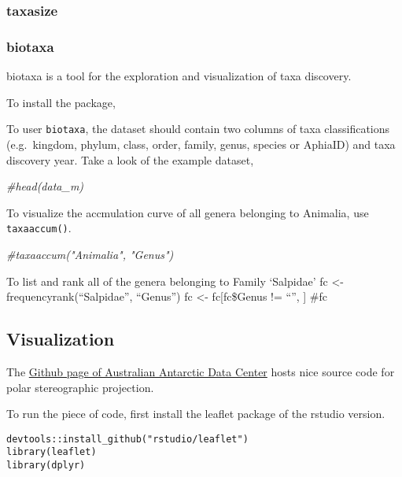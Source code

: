 \documentclass[]{article}
\newenvironment{Shaded}{\begin{snugshade}}{\end{snugshade}}
\newcommand{\CommentTok}[1]{\textcolor[rgb]{0.56,0.35,0.01}{\textit{#1}}}
\begin{document}
\subsubsection{taxasize}\label{taxasize}

\subsubsection{biotaxa}\label{biotaxa}

biotaxa is a tool for the exploration and visualization of taxa
discovery.

To install the package,

To user \texttt{biotaxa}, the dataset should contain two columns of taxa
classifications (e.g.~kingdom, phylum, class, order, family, genus,
species or AphiaID) and taxa discovery year. Take a look of the example
dataset,

\begin{Shaded}
\begin{Highlighting}[]
\CommentTok{#head(data_m)}
\end{Highlighting}
\end{Shaded}

To visualize the accmulation curve of all genera belonging to Animalia,
use \texttt{taxaaccum()}.

\begin{Shaded}
\begin{Highlighting}[]
\CommentTok{#taxaaccum("Animalia", "Genus")}
\end{Highlighting}
\end{Shaded}

To list and rank all of the genera belonging to Family `Salpidae' fc
\textless{}- frequencyrank(``Salpidae'', ``Genus'') fc \textless{}-
fc{[}fc\$Genus != ``'', {]} \#fc

\subsection{Visualization}\label{visualization}

The
\href{https://github.com/AustralianAntarcticDataCentre/antanym-demo}{Github
page of Australian Antarctic Data Center} hosts nice source code for
polar stereographic projection.

To run the piece of code, first install the leaflet package of the
rstudio version.

\begin{verbatim}
devtools::install_github("rstudio/leaflet")
library(leaflet)
library(dplyr)
\end{verbatim}
\end{document}

